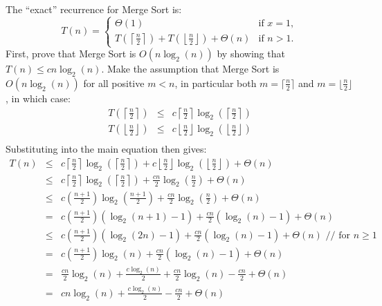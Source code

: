 
The ``exact'' recurrence for Merge Sort is:
\begin{equation*} T(n) = \begin{cases} \Theta(1) & \text{if } x=1,\\ T\left(\left\lceil \frac{n}{2} \right\rceil\right) + T\left(\left\lfloor \frac{n}{2} \right\rfloor\right) + \Theta(n) & \text{if } n > 1.
	\end{cases}
\end{equation*}
First, prove that Merge Sort is $O(n\log_2(n))$ by showing that $T(n) \leq cn\log_2(n)$.  Make the assumption that Merge Sort is $O(n\log_2(n))$ for all positive $m < n$, in particular both $m = \lceil \frac{n}{2} \rceil$ and $m = \lfloor \frac{n}{2} \rfloor$, in which case:
\begin{eqnarray*}
	T\left(\left\lceil \frac{n}{2} \right\rceil\right) &\leq& c\left\lceil\frac{n}{2}\right\rceil \log_2\left(\left\lceil\frac{n}{2}\right\rceil\right) \\
	T\left(\left\lfloor \frac{n}{2} \right\rfloor\right) &\leq& c\left\lfloor\frac{n}{2}\right\rfloor \log_2\left(\left\lfloor\frac{n}{2}\right\rfloor\right) \\
\end{eqnarray*}
Substituting into the main equation then gives:
\begin{eqnarray*}
	T(n) &\leq& c\left\lceil \frac{n}{2} \right\rceil \log_2\left(\left\lceil \frac{n}{2} \right\rceil\right) + c\left\lfloor \frac{n}{2} \right\rfloor \log_2\left(\left\lfloor \frac{n}{2} \right\rfloor\right) + \Theta(n) \\
	 &\leq& c\left\lceil \frac{n}{2} \right\rceil \log_2\left(\left\lceil \frac{n}{2} \right\rceil\right) + \frac{cn}{2} \log_2\left(\frac{n}{2}\right) + \Theta(n) \\
	 &\leq& c\left(\frac{n+1}{2}\right) \log_2\left(\frac{n+1}{2}\right) + \frac{cn}{2} \log_2\left(\frac{n}{2}\right) + \Theta(n) \\
	 &=& c\left(\frac{n+1}{2}\right)(\log_2(n+1)-1) + \frac{cn}{2}(\log_2(n)-1) + \Theta(n) \\
	 &\leq& c\left(\frac{n+1}{2}\right)(\log_2(2n)-1) + \frac{cn}{2}(\log_2(n)-1) + \Theta(n) \text{ // for }n \geq 1 \\
	 &=& c\left(\frac{n+1}{2}\right)\log_2(n) + \frac{cn}{2}(\log_2(n)-1) + \Theta(n) \\
	 &=& \frac{cn}{2}\log_2(n) + \frac{c\log_2(n)}{2} + \frac{cn}{2}\log_2(n) - \frac{cn}{2} + \Theta(n) \\
	 &=& cn\log_2(n) + \frac{c\log_2(n)}{2} - \frac{cn}{2} + \Theta(n) \\
\end{eqnarray*}
